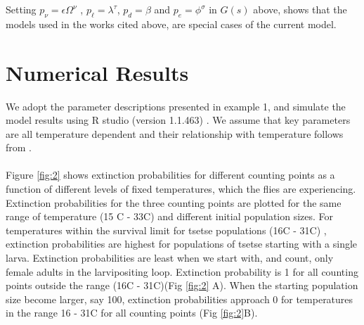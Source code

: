 \documentclass[smallextended]{svjour3}
\begin{document}
Setting  $ p_{\nu}= \epsilon \Omega^{\nu}$ , $p_{\ell} =\lambda^{\tau} $, $p_{d}=\beta$  and $p_{e} = \phi^{\sigma} $ in  $G(s)$ above,   shows that the models used in the works cited above, are special cases of the current model. 



\section{Numerical Results}
\label{section8}

We adopt the parameter descriptions presented in example 1, and simulate the model results using R studio (version 1.1.463) \cite{RStudioTeam2016}. We assume that key parameters are all temperature dependent and their relationship with temperature follows from \cite{Lord2018,PhelpsR.J.&Burrows,Hargrove2004a,Hargrove2019a}.

\paragraph{}


Figure \ref{fig:2} shows extinction probabilities for different counting points as a function of different levels of fixed temperatures, which the flies are experiencing. Extinction probabilities for the three counting points are plotted for the same range of temperature (15 \degree C - 33\degree C) and different initial population sizes. For temperatures within the survival limit for tsetse populations (16\degree C - 31\degree C) \cite{Are2019}, extinction probabilities are highest for populations of tsetse starting with a single larva. Extinction probabilities are least when we start with, and count, only female adults in the larvipositing loop. Extinction probability is 1 for all counting points outside the range (16\degree C - 31\degree C)(Fig \ref{fig:2} A).  When the starting population size become larger, say 100, extinction probabilities approach 0 for temperatures in the range  16 - 31\degree C for all counting points (Fig \ref{fig:2}B).
\end{document}
